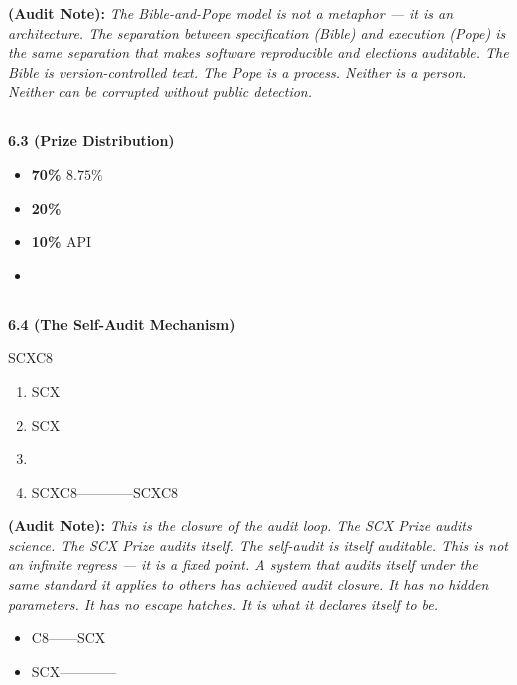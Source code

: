 \documentclass[12pt,a4paper]{article}
\theoremstyle{remark}
\newenvironment{honestbox}{%
    \medskip\noindent
    \color{red}
    \begin{minipage}{0.92\textwidth}
    \textbf{}
    \begin{itemize}[leftmargin=*]
}{%
    \end{itemize}
    \end{minipage}
    \medskip
}
\newcommand{\auditnote}[1]{%
    \medskip\noindent
    \textbf{ (Audit Note):} \textit{#1}%
}
\begin{document}
\auditnote{The Bible-and-Pope model is not a metaphor — it is an architecture. The separation between specification (Bible) and execution (Pope) is the same separation that makes software reproducible and elections auditable. The Bible is version-controlled text. The Pope is a process. Neither is a person. Neither can be corrupted without public detection.}

\subsection{}

\noindent
\textbf{6.3  (Prize Distribution)}

\begin{itemize}
    \item \textbf{70\%}  $8.75\%$
    \item \textbf{20\%} 
    \item \textbf{10\%} API
    \item 
\end{itemize}

\subsection{}

\noindent
\textbf{6.4  (The Self-Audit Mechanism)}

SCXC8

\begin{enumerate}[label=(\arabic*)]
    \item SCX
    \item SCX
    \item 
    \item SCXC8————SCXC8
\end{enumerate}

\auditnote{This is the closure of the audit loop. The SCX Prize audits science. The SCX Prize audits itself. The self-audit is itself auditable. This is not an infinite regress — it is a fixed point. A system that audits itself under the same standard it applies to others has achieved audit closure. It has no hidden parameters. It has no escape hatches. It is what it declares itself to be.}

\begin{honestbox}
    \item C8\textit{}——SCX
    \item SCX————
\end{honestbox}

\subsection{}
\end{document}
